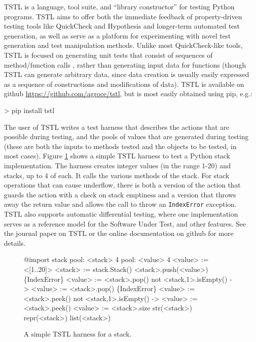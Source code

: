 TSTL \cite{tstlsttt,NFM15,ISSTA15} is a language, tool suite, and
``library constructor'' for testing Python programs.  TSTL aims to
offer both the immediate feedback of property-driven testing tools
like QuickCheck and Hypothesis \cite{ClaessenH00,hypothesis} and
longer-term automated test generation, as well as serve as a platform
for experimenting with novel test generation and test manipulation
methods.   Unlike most QuickCheck-like tools, TSTL is focused on
generating unit tests that consist of sequences of method/function
calls \cite{AndrewsTR}, rather than generating input data for functions (though TSTL
can generate arbitrary data, since data creation is usually easily
expressed as a sequence of constructions and modifications of data).  TSTL is available on github
\url{https://github.com/agroce/tstl}, but is most easily obtained
using pip, e.g.:

{\scriptsize
\begin{code}
> pip install tstl
\end{code}
}

The user of TSTL writes a test harness \cite{WODACommon} that describes
the actions that are possible during testing, and the pools of values
that are generated during testing (these are both the inputs to
methods tested and the objects to be tested, in most cases).  Figure
\ref{fig:stack} shows a simple TSTL harness to test a Python stack
implementation.  The harness creates integer values (in the range
1-20) and stacks, up to 4 of each.  It calls the various methods of
the stack.  For stack operations that can cause underflow, there is
both a version of the action that guards the action with a check on
stack emptiness and a version that throws away the return value and
allows the call to throw an {\tt IndexError} exception.  TSTL also
supports automatic differential testing, where one implementation
serves as a reference model for the Software Under Test, and other
features.  See the journal paper on TSTL \cite{tstlsttt} or the online
documentation on github for more details.

\begin{figure}
{\scriptsize
\begin{code}
@import stack
\vspace{0.1in}
pool: <stack> 4
pool: <value> 4
\vspace{0.1in}
<value> := <[1..20]>
\vspace{0.1in}
<stack> := stack.Stack()
\vspace{0.1in}
<stack>.push(<value>)
\{IndexError\} <value> := <stack>.pop() 
not <stack,1>.isEmpty() -> <value> := <stack>.pop()
\{IndexError\} <value> := <stack>.peek() 
not <stack,1>.isEmpty() -> <value> := <stack>.peek()
<value> := <stack>.size
str(<stack>)
repr(<stack>)
list(<stack>)
\end{code}
}
\caption{A simple TSTL harness for a stack.}
\label{fig:stack}
\end{figure}

